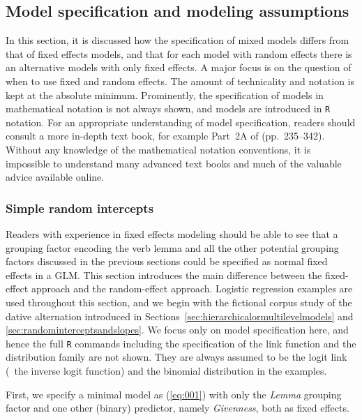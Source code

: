 \subsection{Model specification and modeling assumptions}
\label{sec:modelspecificationandmodelingassumptions}

In this section, it is discussed how the specification of mixed models differs from that of fixed effects models, and that for each model with random effects there is an alternative models with only fixed effects.
A major focus is on the question of when to use fixed and random effects.
The amount of technicality and notation is kept at the absolute minimum.
Prominently, the specification of models in mathematical notation is not always shown, and models are introduced in \texttt{R} notation.
For an appropriate understanding of model specification, readers should consult a more in-depth text book, for example Part~2A of \citet{GelmanHill2006} (pp.~235--342).
Without any knowledge of the mathematical notation conventions, it is impossible to understand many advanced text books and much of the valuable advice available online.

\subsubsection{Simple random intercepts}
\label{sec:simplerandomintercepts}

Readers with experience in fixed effects modeling should be able to see that a grouping factor encoding the verb lemma and all the other potential grouping factors discussed in the previous sections could be specified as normal fixed effects in a GLM.
This section introduces the main difference between the fixed-effect approach and the random-effect approach.
Logistic regression examples are used throughout this section, and we begin with the fictional corpus study of the dative alternation introduced in Sections~\ref{sec:hierarchicalormultilevelmodels} and \ref{sec:randominterceptsandslopes}.
We focus only on model specification here, and hence the full \texttt{R} commands including the specification of the link function and the distribution family are not shown.
They are always assumed to be the logit link (\ie\ the inverse logit function) and the binomial distribution in the examples.

First, we specify a minimal model as (\ref{eq:001}) with only the \textit{Lemma} grouping factor and one other (binary) predictor, namely \textit{Givenness}, both as fixed effects.

